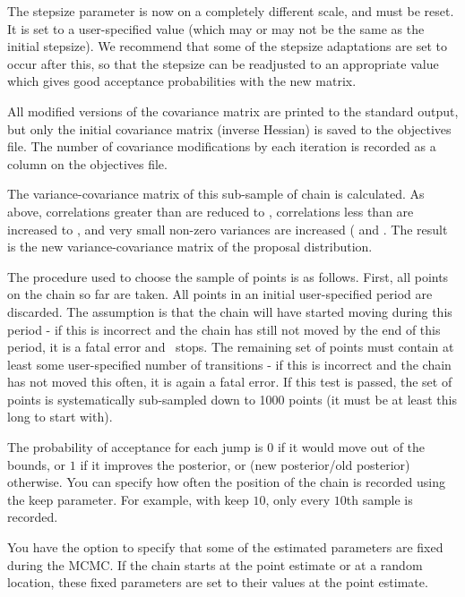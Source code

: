 The stepsize parameter is now on a completely different scale, and must be reset. It is set to a user-specified value (which may or may not be the same as the initial stepsize). We recommend that some of the stepsize adaptations are set to occur after this, so that the stepsize can be readjusted to an appropriate value which gives good acceptance probabilities with the new matrix. 

All modified versions of the covariance matrix are printed to the standard output, but only the initial covariance matrix (inverse Hessian) is saved to the objectives file. The number of covariance modifications by each iteration is recorded as a column on the objectives file.  

The variance-covariance matrix of this sub-sample of chain is calculated. As above, correlations greater than  are reduced to , correlations less than  are increased to  , and very small non-zero variances are increased ( and . The result is the new variance-covariance matrix of the proposal distribution. 


The procedure used to choose the sample of points is as follows. First, all points on the chain so far are taken. All points in an initial user-specified period are discarded. The assumption is that the chain will have started moving during this period - if this is incorrect and the chain has still not moved by the end of this period, it is a fatal error and \CNAME\ stops. The remaining set of points must contain at least some user-specified number of transitions - if this is incorrect and the chain has not moved this often, it is again a fatal error. If this test is passed, the set of points is systematically sub-sampled down to 1000 points (it must be at least this long to start with).

The probability of acceptance for each jump is $0$ if it would move out of the bounds, or $1$ if it improves the posterior, or (new posterior/old posterior) otherwise. You can specify how often the position of the chain is recorded using the keep parameter. For example, with keep $10$, only every $10$th sample is recorded. 

You have the option to specify that some of the estimated parameters are fixed during the MCMC. If the chain starts at the point estimate or at a random location, these fixed parameters are set to their values at the point estimate.

